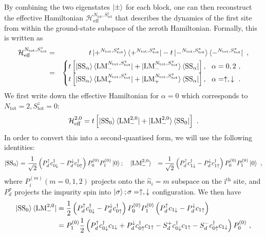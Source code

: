 By combining the two eigenstates \(\ket{\pm}\) for each block, one can then reconstruct the effective Hamiltonian \(\mathcal{H}^{N_\text{tot}, S_\text{tot}^z}_\text{eff}\) that describes the dynamics of the first site from within the ground-state subspace of the zeroth Hamiltonian. Formally, this is written as
\begin{eqnarray}
	\label{eff-ham-all}
	\mathcal{H}^{N_\text{tot}, S_\text{tot}^z}_\text{eff} &=& t\ket{+^{N_\text{tot}, S_\text{tot}^z}}\bra{+^{N_\text{tot}, S_\text{tot}^z}} - t\ket{-^{N_\text{tot}, S_\text{tot}^z}}\bra{-^{N_\text{tot}, S_\text{tot}^z}}~, \nonumber\\
							      &=& \begin{cases} t \left[\ket{\text{SS}_\alpha}\bra{\text{LM}_-^{N_\text{tot}, S_\text{tot}^z}} + \ket{\text{LM}_-^{N_\text{tot}, S_\text{tot}^z}}\bra{\text{SS}_\alpha}\right], ~ ~ \alpha=0,2~,\\
	t \left[\ket{\text{SS}_\alpha}\bra{\text{LM}_+^{N_\text{tot}, S_\text{tot}^z}} + \ket{\text{LM}_+^{N_\text{tot}, S_\text{tot}^z}}\bra{\text{SS}_\alpha}\right], ~ ~ \alpha=\uparrow, \downarrow~.\\
        \end{cases}
\end{eqnarray}
We first write down the effective Hamiltonian for \(\alpha=0\) which corresponds to \(N_\text{tot}=2, S_\text{tot}^z = 0\):
\begin{eqnarray}
	\mathcal{H}^{2, 0}_\text{eff} = t \left[\ket{\text{SS}_0}\bra{\text{LM}_-^{2,0}} + \ket{\text{LM}_-^{2,0}}\bra{\text{SS}_0}\right] ~.
\end{eqnarray}
In order to convert this into a second-quantised form, we will use the following identities:
\begin{eqnarray}
	\ket{\text{SS}_0} &= \frac{1}{\sqrt 2}\left(P_d^{ \uparrow} c^\dagger_{0 \downarrow} - P_d^{ \downarrow} c^\dagger_{0 \uparrow} \right) P_0^{(0)}P_1^{(0)}\ket{0}; \quad \ket{\text{LM}_-^{2,0}} &= \frac{1}{\sqrt 2}\left(P_d^{ \uparrow} c^\dagger_{1 \downarrow} - P_d^{ \downarrow} c^\dagger_{1 \uparrow} \right) P_0^{(0)}P_1^{(0)}\ket{0}~,
\end{eqnarray}
where \(P_i^{(m)} (m=0,1,2)\) projects onto the \(\hat n_i = m\) subspace on the i\(^\text{th}\) site, and \(P_d^\sigma\) projects the impurity spin into \(\ket{\sigma};\sigma=\uparrow,\downarrow\) configuration.
We then have
\begin{eqnarray}
	\ket{\text{SS}_0} \bra{\text{LM}_-^{2,0}} &= \frac{1}{2}\left(P_d^{\uparrow} c^\dagger_{0 \downarrow} - P_{d}^{\downarrow} c^\dagger_{0 \uparrow} \right)P_0^{(0)}P_1^{(0)}\left(P_{d}^{\uparrow} c_{1 \downarrow} - P_{d}^{\downarrow} c_{1 \uparrow} \right)\nonumber \\
						  &= P_1^{(0)}\frac{1}{2}\left(P_d^\uparrow c^\dagger_{0 \downarrow}c_{1 \downarrow} + P_d^\downarrow c^\dagger_{0 \uparrow}c_{1 \uparrow} - S_d^+ c^\dagger_{0 \downarrow} c_{1 \uparrow} - S_d^- c^\dagger_{ 0 \uparrow} c_{1 \downarrow}\right)P_0^{(0)}~,
\end{eqnarray}
